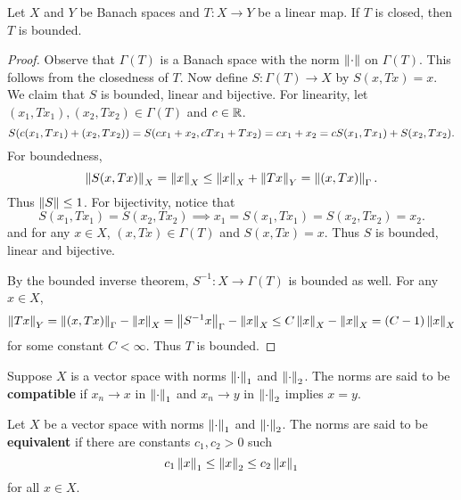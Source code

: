 \begin{theorem}
    Let $X$ and $Y$ be Banach spaces and $T:X\to Y$ be a linear map. If $T$ is 
    closed, then $T$ is bounded.
\end{theorem}
\begin{proof}
    Observe that $\Gamma(T)$ is a Banach space with the norm $\left\lVert {\cdot} \right\rVert$ on 
    $\Gamma(T)$. This follows from the closedness of $T$. Now define $S:\Gamma(T) 
    \to X$ by $S(x,Tx) = x$. We claim that $S$ is bounded, linear and bijective. 
    For linearity, let $(x_1,Tx_1), (x_2,Tx_2)\in \Gamma(T)$ and $c\in\mathbb{R}$. 
    \begin{equation*}
        S\pth{c(x_1,Tx_1) + (x_2,Tx_2)} = S\pth{cx_1 + x_2, cTx_1 + Tx_2} 
        = cx_1 + x_2 = cS(x_1,Tx_1) + S(x_2,Tx_2).
    \end{equation*}
    For boundedness, 
    \begin{equation*}
        \left\lVert {S(x,Tx)} \right\rVert_X = \left\lVert {x} \right\rVert_X \leq \left\lVert {x} \right\rVert_X + \left\lVert {Tx} \right\rVert_Y = \left\lVert {(x,Tx)} \right\rVert_\Gamma. 
    \end{equation*}
    Thus $\left\lVert {S} \right\rVert \leq 1$. For bijectivity, notice that 
    \begin{equation*}
        S(x_1,Tx_1) = S(x_2,Tx_2) \implies x_1 = S(x_1,Tx_1) = S(x_2,Tx_2) = x_2.
    \end{equation*}
    and for any $x\in X$, $(x,Tx)\in\Gamma(T)$ and $S(x,Tx) = x$. Thus $S$ is 
    bounded, linear and bijective.

    By the bounded inverse theorem, $S^{-1}:X\to\Gamma(T)$ is bounded as well. For 
    any $x\in X$, 
    \begin{equation*}
        \left\lVert {Tx} \right\rVert_Y = \left\lVert {(x,Tx)} \right\rVert_\Gamma - \left\lVert {x} \right\rVert_X 
        = \left\lVert {S^{-1}x} \right\rVert_\Gamma - \left\lVert {x} \right\rVert_X 
        \leq C\left\lVert {x} \right\rVert_X - \left\lVert {x} \right\rVert_X = (C-1)\left\lVert {x} \right\rVert_X
    \end{equation*}
    for some constant $C<\infty$. Thus $T$ is bounded.
\end{proof}

\begin{definition}
    Suppose $X$ is a vector space with norms $\left\lVert {\cdot} \right\rVert_1$ and $\left\lVert {\cdot} \right\rVert_2$. 
    The norms are said to be \textbf{compatible} if $x_n\to x$ in $\left\lVert {\cdot} \right\rVert_1$ 
    and $x_n\to y$ in $\left\lVert {\cdot} \right\rVert_2$ implies $x=y$.
\end{definition}

\begin{definition}
    Let $X$ be a vector space with norms $\left\lVert {\cdot} \right\rVert_1$ and $\left\lVert {\cdot} \right\rVert_2$. The 
    norms are said to be \textbf{equivalent} if there are constants $c_1,c_2>0$ such 
    \begin{equation*}
        c_1\left\lVert {x} \right\rVert_1 \leq \left\lVert {x} \right\rVert_2 \leq c_2\left\lVert {x} \right\rVert_1
    \end{equation*}
    for all $x\in X$.
\end{definition}

